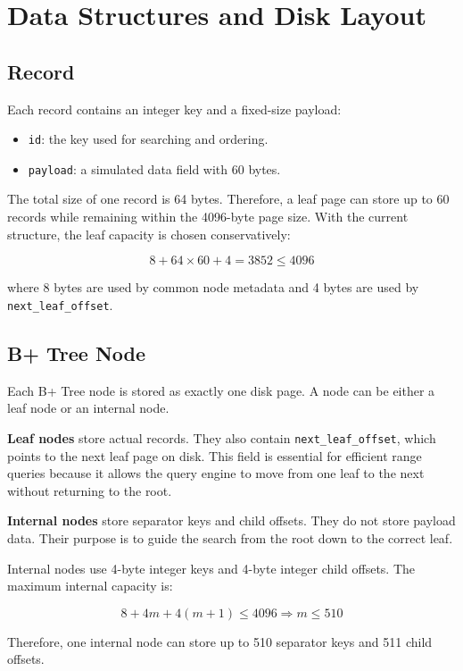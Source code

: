 \documentclass[12pt,a4paper]{article}
\begin{document}
\section{Data Structures and Disk Layout}

\subsection{Record}

Each record contains an integer key and a fixed-size payload:

\begin{itemize}
    \item \texttt{id}: the key used for searching and ordering.
    \item \texttt{payload}: a simulated data field with 60 bytes.
\end{itemize}

The total size of one record is 64 bytes. Therefore, a leaf page can store up to 60 records while remaining within the 4096-byte page size. With the current structure, the leaf capacity is chosen conservatively:

\[
8 + 64 \times 60 + 4 = 3852 \leq 4096
\]

where 8 bytes are used by common node metadata and 4 bytes are used by \texttt{next\_leaf\_offset}.

\subsection{B+ Tree Node}

Each B+ Tree node is stored as exactly one disk page. A node can be either a leaf node or an internal node.

\textbf{Leaf nodes} store actual records. They also contain \texttt{next\_leaf\_offset}, which points to the next leaf page on disk. This field is essential for efficient range queries because it allows the query engine to move from one leaf to the next without returning to the root.

\textbf{Internal nodes} store separator keys and child offsets. They do not store payload data. Their purpose is to guide the search from the root down to the correct leaf.

Internal nodes use 4-byte integer keys and 4-byte integer child offsets. The maximum internal capacity is:

\[
8 + 4m + 4(m + 1) \leq 4096 \Rightarrow m \leq 510
\]

Therefore, one internal node can store up to 510 separator keys and 511 child offsets.
\end{document}
